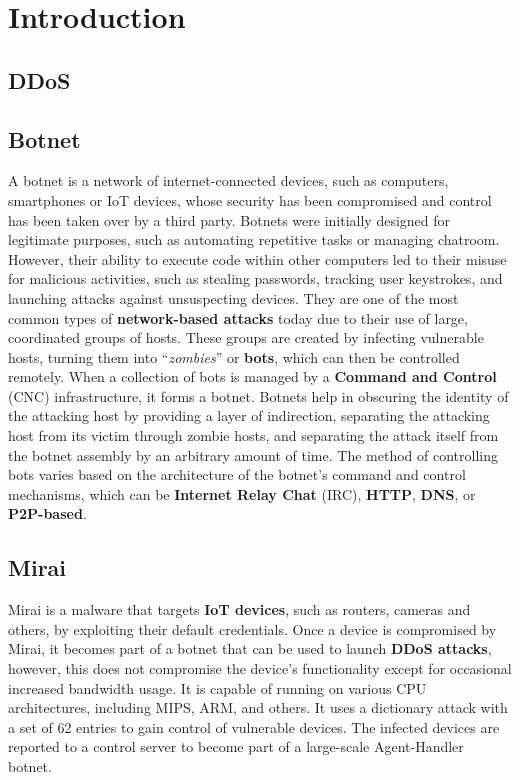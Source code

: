 \chapter{Introduction}
\label{chapter:introduction}

\section{DDoS}

\section{Botnet}

A botnet is a network of internet-connected devices, such as computers, smartphones or IoT devices, whose security has been compromised and control has been taken over by a third party. Botnets were initially designed for legitimate purposes, such as automating repetitive tasks or managing chatroom. However, their ability to execute code within other computers led to their misuse for malicious activities, such as stealing passwords, tracking user keystrokes, and launching attacks against unsuspecting devices. \cite{fortinet-botnet} They are one of the most common types of \textbf{network-based attacks} today due to their use of large, coordinated groups of hosts. These groups are created by infecting vulnerable hosts,  turning them into ``\textit{zombies}'' or \textbf{bots}, which can then be controlled remotely. When a collection of bots is managed by a \textbf{Command and Control} (CNC) infrastructure, it forms a botnet. Botnets help in obscuring the identity of the attacking host by providing a layer of indirection, separating the attacking host from its victim through zombie hosts, and separating the attack itself from the botnet assembly by an arbitrary amount of time. \cite{strayer2008botnet} The method of controlling bots varies based on the architecture of the botnet's command and control mechanisms, which can be \textbf{Internet Relay Chat} (IRC), \textbf{HTTP}, \textbf{DNS}, or \textbf{P2P-based}. 

\section{Mirai}

Mirai is a malware that targets \textbf{IoT devices}, such as routers, cameras and others, by exploiting their default credentials. Once a device is compromised by Mirai, it becomes part of a botnet that can be used to launch \textbf{DDoS attacks}, however, this does not compromise the device's functionality except for occasional increased bandwidth usage. It is capable of running on various CPU architectures, including MIPS, ARM, and others. It uses a dictionary attack with a set of 62 entries to gain control of vulnerable devices. The infected devices are reported to a control server to become part of a large-scale Agent-Handler botnet. \cite{de2018ddos}

